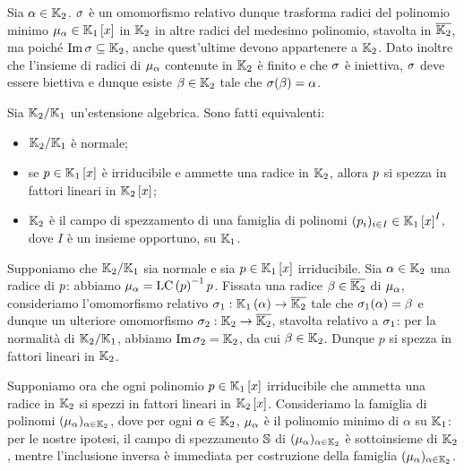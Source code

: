 \Proof Sia $\alpha \in \mathbb{K}_2$. $\sigma$ \`e un omomorfismo relativo dunque trasforma radici del polinomio minimo $\MinimalPolynomial{\alpha} \in \RingAdjunction{\Field_1}{x}$ in $\mathbb{K}_2$ in altre radici del medesimo polinomio, stavolta in $\overline{\mathbb{K}_2}$, ma poich\'e $\operatorname{Im} \sigma \subseteq \mathbb{K}_2$, anche quest'ultime devono appartenere a $\mathbb{K}_2$. Dato inoltre che l'insieme di radici di $\MinimalPolynomial{\alpha}$ contenute in $\mathbb{K}_2$ \`e finito e che $\sigma$ \`e iniettiva, $\sigma$ deve essere biettiva e dunque esiste $\beta \in \mathbb{K}_2$ tale che $\sigma(\beta) = \alpha$. \EndProof
\begin{Theorem}
	Sia $\mathbb{K}_2/\mathbb{K}_1$ un'estensione algebrica. Sono fatti equivalenti:
	\begin{itemize}
		\item $\mathbb{K}_2/\mathbb{K}_1$ \`e normale;
		\item se $p \in \mathbb{K}_1 \left [ x \right ]$ \`e irriducibile e ammette una radice in $\mathbb{K}_2$, allora $p$ si spezza in fattori lineari in $\mathbb{K}_2 \left [ x \right ]$;
		\item $\mathbb{K}_2$ \`e il campo di spezzamento di una famiglia di polinomi $(p_i)_{i \in I} \in \mathbb{K}_1 \left [ x \right ]^I$, dove $I$ \`e un insieme opportuno, su $\mathbb{K}_1$.
	\end{itemize}
\end{Theorem}
\Proof Supponiamo che $\mathbb{K}_2/\mathbb{K}_1$ sia normale e sia $p \in \mathbb{K}_1 \left [ x \right ]$ irriducibile. Sia $\alpha \in \mathbb{K}_2$ una radice di $p$: abbiamo $\MinimalPolynomial{\alpha} = \LC{\Polynomial}^{-1} p$. Fissata una radice $\beta \in \overline{\mathbb{K}_2}$ di $\MinimalPolynomial{\alpha}$, consideriamo l'omomorfismo relativo $\sigma_1: \mathbb{K}_1 \left ( \alpha \right ) \rightarrow \overline{\mathbb{K}_2}$ tale che $\sigma_1(\alpha) = \beta$ e dunque un ulteriore omomorfismo $\sigma_2: \mathbb{K}_2 \rightarrow \overline{\mathbb{K}_2}$, stavolta relativo a $\sigma_1$: per la normalit\`a di $\mathbb{K}_2/\mathbb{K}_1$, abbiamo $\operatorname{Im} \sigma_2 = \mathbb{K}_2$, da cui $\beta \in \mathbb{K}_2$. Dunque $p$ si spezza in fattori lineari in $\mathbb{K}_2$.
\par Supponiamo ora che ogni polinomio $p \in \mathbb{K}_1 \left [ x \right ]$ irriducibile che ammetta una radice in $\mathbb{K}_2$ si spezzi in fattori lineari in $\mathbb{K}_2 \left [ x \right ]$. Consideriamo la famiglia di polinomi $(\MinimalPolynomial{\alpha})_{\alpha \in \Field_2}$, dove per ogni $\alpha \in \mathbb{K}_2$, $\MinimalPolynomial{\alpha}$ \`e il polinomio minimo di $\alpha$ su $\mathbb{K}_1$: per le nostre ipotesi, il campo di spezzamento $\mathbb{S}$ di $(\MinimalPolynomial{\alpha})_{\alpha \in \Field_2}$ \`e sottoinsieme di $\mathbb{K}_2$, mentre l'inclusione inversa \`e immediata per costruzione della famiglia $(\MinimalPolynomial{\alpha})_{\alpha \in \Field_2}$.
